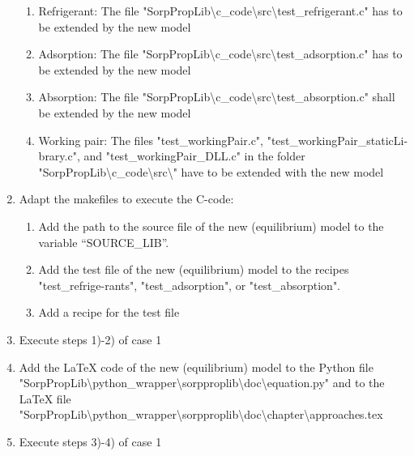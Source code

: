 \begin{enumerate}
\begin{enumerate}
		\item Refrigerant: The file "SorpPropLib\textbackslash c\_code\textbackslash src\textbackslash test\_refrigerant.c" has to be extended by the new model
		\item Adsorption: The file "SorpPropLib\textbackslash c\_code\textbackslash src\textbackslash test\_adsorption.c" has to be extended by the new model
		\item Absorption: The file "SorpPropLib\textbackslash c\_code\textbackslash src\textbackslash test\_absorption.c" shall be extended by the new model
		\item Working pair: The files "test\_workingPair.c", "test\_workingPair\_staticLi-brary.c", and "test\_workingPair\_DLL.c" in the folder "SorpPropLib\textbackslash c\_code\newline \textbackslash src\textbackslash " have to be extended with the new model
	\end{enumerate}
	\item Adapt the makefiles to execute the C-code:
	\begin{enumerate}
		\item Add the path to the source file of the new (equilibrium) model to the variable “SOURCE\_LIB”.
		\item Add the test file of the new (equilibrium) model to the recipes "test\_refrige-rants", "test\_adsorption", or "test\_absorption".
		\item Add a recipe for the test file
	\end{enumerate}
	\item Execute steps 1)-2) of case 1
	\item Add the LaTeX code of the new (equilibrium) model to the Python file "SorpPropLib\textbackslash python\_wrapper\textbackslash sorpproplib\textbackslash doc\textbackslash equation.py" and to the LaTeX file "SorpPropLib\textbackslash python\_wrapper\textbackslash sorpproplib\textbackslash doc\textbackslash chapter\textbackslash approaches.tex
	\item Execute steps 3)-4) of case 1
\end{enumerate}
